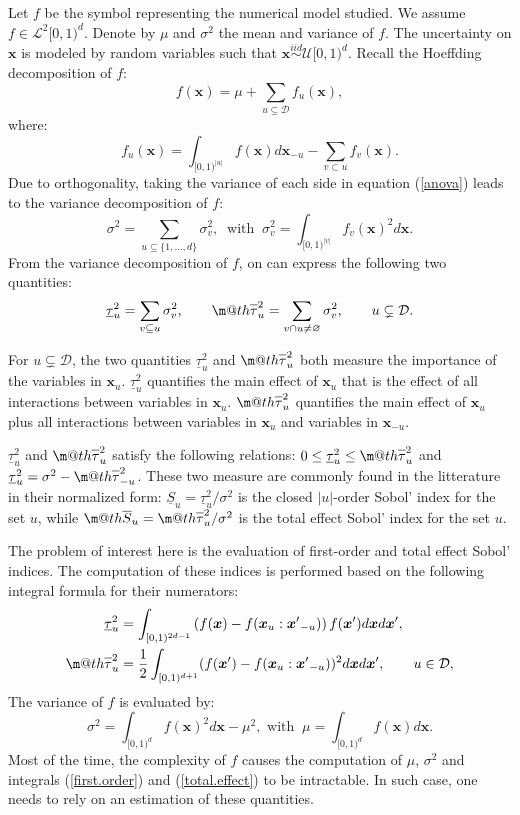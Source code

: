 \documentclass[]{elsarticle}
\makeatletter
\theoremstyle{definition}
\newcommand{\bvec}[1]{\boldsymbol{#1}}
\newcommand{\vx}{\bvec{x}}
\newcommand\iid{\stackrel{iid}{\sim}}
\newcommand*{\ov}[1]{
  \m@th\overline{\mbox{#1}\raisebox{2mm}{}}
}
\makeatother
\begin{document}
Let $f$ be the symbol representing the numerical model studied. We assume $f \in \mathcal{L}^2[0,1)^d$. Denote by $\mu$ and $\sigma^2$ the mean and variance of $f$.
The uncertainty on $\vx$ is modeled by random variables such that $\vx \iid \mathcal{U}[0,1)^d$. Recall the Hoeffding decomposition \cite{Hoeffding} of $f$:
\begin{equation}
f(\vx)=\mu+\sum \limits_{u \subseteq \mathcal{D}} f_u(\vx),
\label{anova}
\end{equation}
where:
\[f_u(\vx)= \int_{[0,1)^{|u|}} f(\vx) d{\vx}_{-u} - \sum \limits_{v \subset u} f_v(\vx).\]
Due to orthogonality, taking the variance of each side in equation (\ref{anova}) leads to the variance decomposition of $f$:
\[ \sigma^2 = \sum \limits_{u \subseteq \{1,\dots,d\}} \sigma_v^2, \ \text{ with } \ \sigma_v^2=\int_{[0,1)^{|v|}} f_v(\vx)^2 d{\vx}.\]
From the variance decomposition of $f$, on can express the following two quantities:
\[\underline{\tau}_u^2 = \sum \limits_{v \subseteq u} \sigma_v^2, \qquad
\ov{$\tau$}_u^2 = \sum \limits_{v \cap u \neq \varnothing} \sigma_v^2, \qquad u \subsetneq \mathcal{D}.\]

For $u \subsetneq \mathcal{D}$, the two quantities $\underline{\tau}_u^2$ and $\ov{$\tau$}_u^2$ both measure the importance of the variables in $\vx_u$. $\underline{\tau}_u^2$ quantifies the main effect of $\vx_u$ that is the effect of all interactions between variables in $\vx_u$. $\ov{$\tau$}_u^2$ quantifies the main effect of $\vx_u$ plus all interactions between variables in $\vx_u$ and variables in $\vx_{-u}$.

$\underline{\tau}_u^2$ and $\ov{$\tau$}_u^2$ satisfy the following relations: $ 0 \leq  \underline{\tau}_u^2 \leq \ov{$\tau$}_u^2$ and $\underline{\tau}_u^2 = \sigma^2 - \ov{$\tau$}_{-u}^2$. These two measure are commonly found in the litterature in their normalized form: $\underline{S}_u = \underline{\tau}_u^2 / \sigma^2$ is the closed $|u|$-order Sobol' index for the set $u$, while $\ov{$S$}_u = \ov{$\tau$}_u^2 / \sigma^2$ is the total effect Sobol' index for the set $u$.
\bigskip

The problem of interest here is the evaluation of first-order and total effect Sobol' indices. The computation of these indices is performed based on the following integral formula for their numerators:
\begin{align}
\label{first.order}
\underline{\tau}_u^2  &= \int_{[0,1)^{2d-1}} \left(f(\vx)-
f(\vx_u:{\vx'}_{-u})\right)f(\vx')d\vx d{\vx'}, \\
\label{total.effect}
\ov{$\tau$}_u^2 &= \frac{1}{2}\int_{[0,1)^{d+1}}(f(\vx')-f(\vx_u:{\vx'}_{-u}))^2d\vx d{\vx'}, \qquad u \in \mathcal{D},
\end{align}
The variance of $f$ is evaluated by:
\[ \sigma^2 = \int_{[0,1)^{d}} f(\vx)^2d{\vx} - \mu^2, \text{ with } \ \mu = \int_{[0,1)^{d}} f(\vx) d{\vx}.\]
Most of the time, the complexity of $f$ causes the computation of $\mu$, $\sigma^2$ and integrals (\ref{first.order}) and (\ref{total.effect}) to be intractable. In such case, one needs to rely on an estimation of these quantities.
\end{document}

